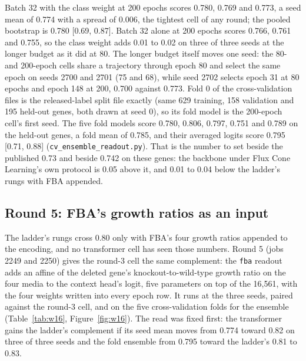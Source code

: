 Batch 32 with the class weight at 200 epochs scores 0.780, 0.769 and 0.773, a seed mean of
0.774 with a spread of 0.006, the tightest cell of any round; the pooled bootstrap is 0.780
[0.69, 0.87]. Batch 32 alone at 200 epochs scores 0.766, 0.761 and 0.755, so the class
weight adds 0.01 to 0.02 on three of three seeds at the longer budget as it did at 80.
The longer budget itself moves one seed: the 80- and 200-epoch cells share a trajectory
through epoch 80 and select the same epoch on seeds 2700 and 2701 (75 and 68), while seed
2702 selects epoch 31 at 80 epochs and epoch 148 at 200, 0.700 against 0.773. Fold 0 of
the cross-validation files is the released-label split file exactly (same 629 training,
158 validation and 195 held-out genes, both drawn at seed 0), so its fold model is the
200-epoch cell's first seed. The five fold models score 0.780, 0.806, 0.797, 0.751 and
0.789 on the held-out genes, a fold mean of 0.785, and their averaged logits score 0.795
[0.71, 0.88] (\texttt{cv\_ensemble\_readout.py}). That is the number to set beside the
published 0.73 and beside 0.742 on these genes: the backbone under Flux Cone Learning's own
protocol is 0.05 above it, and 0.01 to 0.04 below the ladder's rungs with FBA appended.

\subsection{Round 5: FBA's growth ratios as an input}

The ladder's rungs cross 0.80 only with FBA's four growth ratios appended to the encoding,
and no transformer cell has seen those numbers. Round 5 (jobs 2249 and 2250) gives the
round-3 cell the same complement: the \texttt{fba} readout adds an affine of the deleted
gene's knockout-to-wild-type growth ratio on the four media to the context head's logit,
five parameters on top of the 16,561, with the four weights written into every epoch row.
It runs at the three seeds, paired against the round-3 cell, and on the five
cross-validation folds for the ensemble (Table~\ref{tab:w16}, Figure~\ref{fig:w16}). The
read was fixed first: the transformer gains the ladder's complement if its seed mean moves
from 0.774 toward 0.82 on three of three seeds and the fold ensemble from 0.795 toward the
ladder's 0.81 to 0.83.




